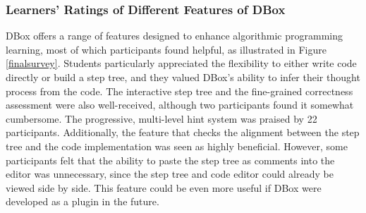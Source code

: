 








\subsubsection{Learners' Ratings of Different Features of DBox}
DBox offers a range of features designed to enhance algorithmic programming learning, most of which participants found helpful, as illustrated in Figure \ref{finalsurvey}. Students particularly appreciated the flexibility to either write code directly or build a step tree, and they valued DBox's ability to infer their thought process from the code. The interactive step tree and the fine-grained correctness assessment were also well-received, although two participants found it somewhat cumbersome. The progressive, multi-level hint system was praised by 22 participants. Additionally, the feature that checks the alignment between the step tree and the code implementation was seen as highly beneficial. However, some participants felt that the ability to paste the step tree as comments into the editor was unnecessary, since the step tree and code editor could already be viewed side by side. This feature could be even more useful if DBox were developed as a plugin in the future.

